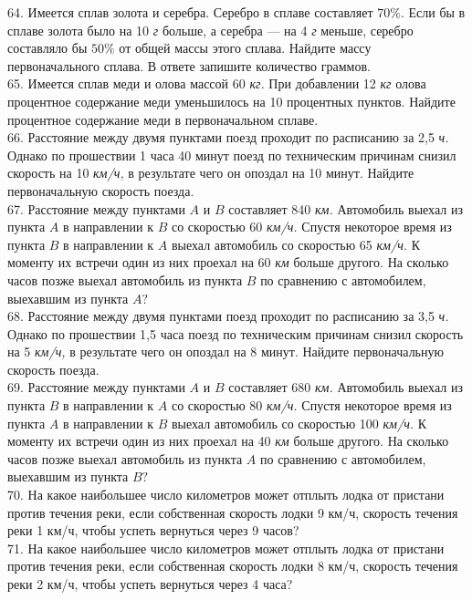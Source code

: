 64. Имеется сплав золота и серебра. Серебро в сплаве составляет $70\%.$ Если бы в сплаве золота было на 10 {\it г} больше, а серебра --- на 4 {\it г} меньше, серебро составляло бы $50\%$ от общей массы этого сплава. Найдите массу первоначального сплава. В ответе запишите количество граммов.\\
65. Имеется сплав меди и олова массой 60 {\it кг.} При добавлении 12 {\it кг} олова процентное содержание меди уменьшилось на 10 процентных пунктов. Найдите процентное содержание меди в первоначальном сплаве.\\
66. Расстояние между двумя пунктами поезд проходит по расписанию за 2,5 {\it ч.} Однако по прошествии 1 часа 40 минут поезд по техническим причинам снизил скорость на 10 {\it км/ч,} в результате чего он опоздал на 10 минут. Найдите первоначальную скорость поезда.\\
67. Расстояние между пунктами $A$ и $B$ составляет 840 {\it км.} Автомобиль выехал из пункта $A$ в направлении к $B$ со скоростью 60 {\it км/ч.} Спустя некоторое время из пункта $B$ в направлении к $A$ выехал автомобиль со скоростью 65 {\it км/ч.} К моменту их встречи один из них проехал на 60 {\it км} больше другого. На сколько часов позже выехал автомобиль из пункта $B$ по сравнению с автомобилем, выехавшим из пункта $A?$\\
68. Расстояние между двумя пунктами поезд проходит по расписанию за 3,5 {\it ч.} Однако по прошествии 1,5 часа поезд по техническим причинам снизил скорость на 5 {\it км/ч,} в результате чего он опоздал на 8 минут. Найдите первоначальную скорость поезда.\\
69. Расстояние между пунктами $A$ и $B$ составляет 680 {\it км.} Автомобиль выехал из пункта $B$ в направлении к $A$ со скоростью 80 {\it км/ч.} Спустя некоторое время из пункта $A$ в направлении к $B$ выехал автомобиль со скоростью 100 {\it км/ч.} К моменту их встречи один из них проехал на 40 {\it км} больше другого. На сколько часов позже выехал автомобиль из пункта $A$ по сравнению с автомобилем, выехавшим из пункта $B?$\\
70. На какое наибольшее число километров может отплыть лодка от пристани против течения реки, если собственная скорость лодки 9 км/ч, скорость течения реки 1 км/ч, чтобы успеть вернуться через 9 часов?\\
71. На какое наибольшее число километров может отплыть лодка от пристани против течения реки, если собственная скорость лодки 8 км/ч, скорость течения реки 2 км/ч, чтобы успеть вернуться через 4 часа?\\
